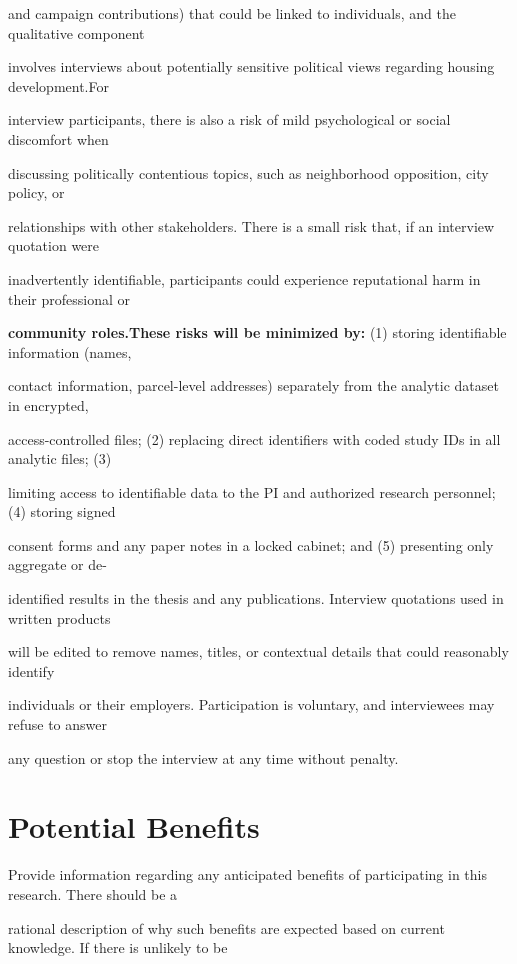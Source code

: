 \documentclass[10pt, letterpaper]{article}
\begin{document}
and campaign contributions) that could be linked to individuals, and the qualitative component

involves interviews about potentially sensitive political views regarding housing development.For

interview participants, there is also a risk of mild psychological or social discomfort when

discussing politically contentious topics, such as neighborhood opposition, city policy, or

relationships with other stakeholders. There is a small risk that, if an interview quotation were

inadvertently identifiable, participants could experience reputational harm in their professional or

\noindent \textbf{community roles.These risks will be minimized by:} (1) storing identifiable information (names,

contact information, parcel-level addresses) separately from the analytic dataset in encrypted,

access-controlled files; (2) replacing direct identifiers with coded study IDs in all analytic files; (3)

limiting access to identifiable data to the PI and authorized research personnel; (4) storing signed

consent forms and any paper notes in a locked cabinet; and (5) presenting only aggregate or de-

identified results in the thesis and any publications. Interview quotations used in written products

will be edited to remove names, titles, or contextual details that could reasonably identify

individuals or their employers. Participation is voluntary, and interviewees may refuse to answer

any question or stop the interview at any time without penalty.

\vspace{0.5em}

\section*{Potential Benefits}

Provide information regarding any anticipated benefits of participating in this research. There should be a

rational description of why such benefits are expected based on current knowledge. If there is unlikely to be
\end{document}
